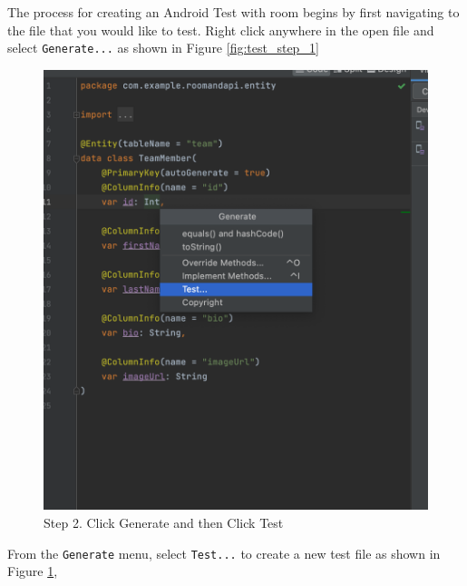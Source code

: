 \documentclass[12pt]{article}
\begin{document}
The process for creating an Android Test with room begins by first navigating to the file that you would like to test. Right click anywhere in the open file and select \verb|Generate...| as shown in Figure \ref{fig:test_step_1}

\begin{figure}[H]
    \centering
    \includegraphics[trim=10 10 10 50, clip, width=\textwidth] {images/testing/2_generate_test.png}
    \caption{Step 2. Click Generate and then Click Test}
    \label{fig:test_step_2}
\end{figure}

From the \verb|Generate| menu, select \verb|Test...| to create a new test file as shown in Figure \ref{fig:test_step_2},
\end{document}
